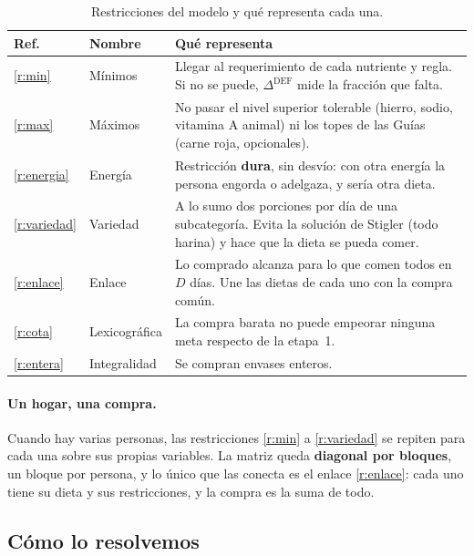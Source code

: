 \documentclass[10pt,a4paper]{article}
\newcommand{\Ddef}{\Delta^{\mathrm{DEF}}}
\begin{document}
\begin{table}[tbp]
\centering\small
\caption{Restricciones del modelo y qué representa cada una.}
\label{tab:restricciones}
\renewcommand{\arraystretch}{1.2}
\begin{tabularx}{\linewidth}{@{}lp{3.1cm}X@{}}
\toprule
\textbf{Ref.} & \textbf{Nombre} & \textbf{Qué representa} \\
\midrule
\eqref{r:min}      & Mínimos      & Llegar al requerimiento de cada nutriente y regla. Si no se puede, $\Ddef$ mide la fracción que falta. \\
\eqref{r:max}      & Máximos      & No pasar el nivel superior tolerable (hierro, sodio, vitamina A animal) ni los topes de las Guías (carne roja, opcionales). \\
\eqref{r:energia}  & Energía      & Restricción \textbf{dura}, sin desvío: con otra energía la persona engorda o adelgaza, y sería otra dieta. \\
\eqref{r:variedad} & Variedad     & A lo sumo dos porciones por día de una subcategoría. Evita la solución de Stigler (todo harina) y hace que la dieta se pueda comer. \\
\eqref{r:enlace}   & Enlace       & Lo comprado alcanza para lo que comen todos en $D$ días. Une las dietas de cada uno con la compra común. \\
\eqref{r:cota}     & Lexicográfica & La compra barata no puede empeorar ninguna meta respecto de la etapa~1. \\
\eqref{r:entera}   & Integralidad & Se compran envases enteros. \\
\bottomrule
\end{tabularx}
\end{table}

\paragraph{Un hogar, una compra.} Cuando hay varias personas, las restricciones
\eqref{r:min} a \eqref{r:variedad} se repiten para cada una sobre sus propias
variables. La matriz queda \textbf{diagonal por bloques}, un bloque por persona, y lo
único que las conecta es el enlace \eqref{r:enlace}: cada uno tiene su dieta y sus
restricciones, y la compra es la suma de todo.

\subsection{Cómo lo resolvemos}
\label{sec:resolucion}
\end{document}
